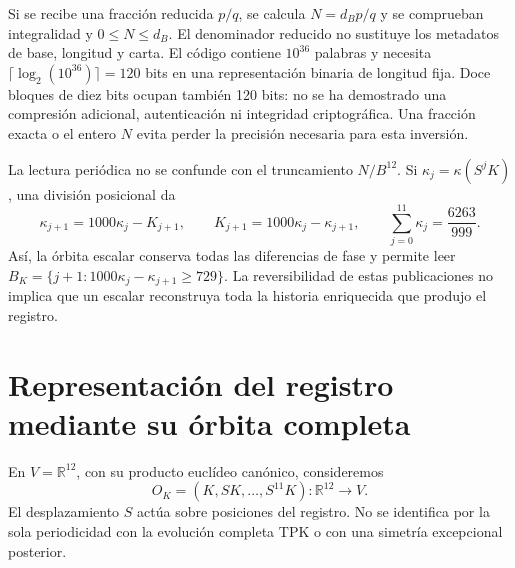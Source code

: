 Si se recibe una fracción reducida \(p/q\), se calcula
\(N=d_Bp/q\) y se comprueban integralidad y \(0\leq N\leq d_B\).
El denominador reducido no sustituye los metadatos de base, longitud y
carta. El código contiene \(10^{36}\) palabras y necesita
\(\lceil\log_2(10^{36})\rceil=120\) bits en una representación binaria
de longitud fija. Doce bloques de diez bits ocupan también 120 bits: no se
ha demostrado una compresión adicional, autenticación ni integridad
criptográfica. Una fracción exacta o el entero \(N\) evita perder la
precisión necesaria para esta inversión.

La lectura periódica no se confunde con el truncamiento \(N/B^{12}\).
Si \(\kappa_j=\kappa(S^jK)\), una división posicional da
\begin{equation}
 \kappa_{j+1}=1000\kappa_j-K_{j+1},\qquad
 K_{j+1}=1000\kappa_j-\kappa_{j+1},\qquad
 \sum_{j=0}^{11}\kappa_j=\frac{6263}{999}.
 \label{x_reciprocidad:lib01:orbita-kappa}
\end{equation}
Así, la órbita escalar conserva todas las diferencias de fase y permite
leer \(B_K=\{j+1:1000\kappa_j-\kappa_{j+1}\geq729\}\).
La reversibilidad de estas publicaciones no implica que un escalar
reconstruya toda la historia enriquecida que produjo el registro.

\section{Representación del registro mediante su órbita completa}
\label{x_reciprocidad:lib01:orbita}

En \(V=\mathbb R^{12}\), con su producto euclídeo canónico, consideremos
\[
 O_K=(K,SK,\ldots,S^{11}K):\mathbb R^{12}\longrightarrow V.
\]
El desplazamiento \(S\) actúa sobre posiciones del registro. No se
identifica por la sola periodicidad con la evolución completa TPK o con
una simetría excepcional posterior.

